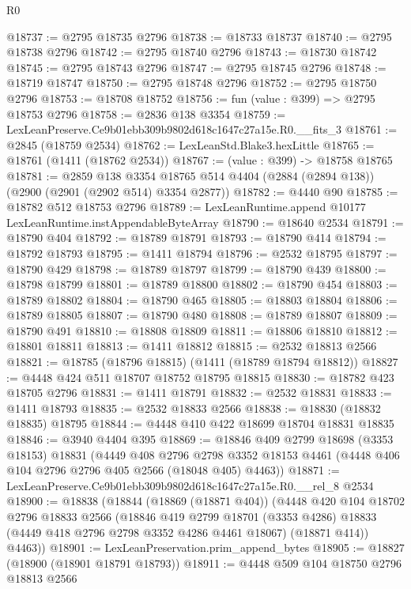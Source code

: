 \begin{lexlean}{R0}
\begin{coremodule}
@18737 := @2795 @18735 @2796
@18738 := @18733 @18737
@18740 := @2795 @18738 @2796
@18742 := @2795 @18740 @2796
@18743 := @18730 @18742
@18745 := @2795 @18743 @2796
@18747 := @2795 @18745 @2796
@18748 := @18719 @18747
@18750 := @2795 @18748 @2796
@18752 := @2795 @18750 @2796
@18753 := @18708 @18752
@18756 := fun (value : @399) => @2795 @18753 @2796
@18758 := @2836 @138 @3354
@18759 := LexLeanPreserve.Ce9b01ebb309b9802d618c1647c27a15e.R0.__fits_3
@18761 := @2845 (@18759 @2534)
@18762 := LexLeanStd.Blake3.hexLittle
@18765 := @18761 (@1411 (@18762 @2534))
@18767 := (value : @399) -> @18758 @18765
@18781 := @2859
    @138
    @3354
    @18765
    @514
    @4404
    (@2884 (@2894 @138))
    (@2900 (@2901 (@2902 @514) @3354 @2877))
@18782 := @4440 @90
@18785 := @18782 @512 @18753 @2796
@18789 := LexLeanRuntime.append @10177 LexLeanRuntime.instAppendableByteArray
@18790 := @18640 @2534
@18791 := @18790 @404
@18792 := @18789 @18791
@18793 := @18790 @414
@18794 := @18792 @18793
@18795 := @1411 @18794
@18796 := @2532 @18795
@18797 := @18790 @429
@18798 := @18789 @18797
@18799 := @18790 @439
@18800 := @18798 @18799
@18801 := @18789 @18800
@18802 := @18790 @454
@18803 := @18789 @18802
@18804 := @18790 @465
@18805 := @18803 @18804
@18806 := @18789 @18805
@18807 := @18790 @480
@18808 := @18789 @18807
@18809 := @18790 @491
@18810 := @18808 @18809
@18811 := @18806 @18810
@18812 := @18801 @18811
@18813 := @1411 @18812
@18815 := @2532 @18813 @2566
@18821 := @18785 (@18796 @18815) (@1411 (@18789 @18794 @18812))
@18827 := @4448 @424 @511 @18707 @18752 @18795 @18815
@18830 := @18782 @423 @18705 @2796
@18831 := @1411 @18791
@18832 := @2532 @18831
@18833 := @1411 @18793
@18835 := @2532 @18833 @2566
@18838 := @18830 (@18832 @18835) @18795
@18844 := @4448 @410 @422 @18699 @18704 @18831 @18835
@18846 := @3940 @4404 @395
@18869 := @18846
    @409
    @2799
    @18698
    (@3353 @18153)
    @18831
    (@4449
      @408
      @2796
      @2798
      @3352
      @18153
      @4461
      (@4448 @406 @104 @2796 @2796 @405 @2566 (@18048 @405) @4463))
@18871 := LexLeanPreserve.Ce9b01ebb309b9802d618c1647c27a15e.R0.__rel_8 @2534
@18900 := @18838
    (@18844
      (@18869 (@18871 @404))
      (@4448
        @420
        @104
        @18702
        @2796
        @18833
        @2566
        (@18846
          @419
          @2799
          @18701
          (@3353 @4286)
          @18833
          (@4449 @418 @2796 @2798 @3352 @4286 @4461 @18067)
          (@18871 @414))
        @4463))
@18901 := LexLeanPreservation.prim_append_bytes
@18905 := @18827 (@18900 (@18901 @18791 @18793))
@18911 := @4448 @509 @104 @18750 @2796 @18813 @2566

\end{coremodule}
\end{lexlean}
